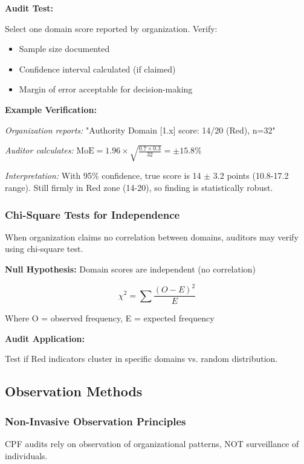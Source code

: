 \documentclass[11pt,a4paper]{article}
\begin{document}
\textbf{Audit Test:}

Select one domain score reported by organization. Verify:
\begin{itemize}
\item Sample size documented
\item Confidence interval calculated (if claimed)
\item Margin of error acceptable for decision-making
\end{itemize}

\textbf{Example Verification:}

\textit{Organization reports:} "Authority Domain [1.x] score: 14/20 (Red), n=32"

\textit{Auditor calculates:} $\text{MoE} = 1.96 \times \sqrt{\frac{0.7 \times 0.3}{32}} = \pm 15.8\%$

\textit{Interpretation:} With 95\% confidence, true score is 14 $\pm$ 3.2 points (10.8-17.2 range). Still firmly in Red zone (14-20), so finding is statistically robust.

\subsubsection{Chi-Square Tests for Independence}

When organization claims no correlation between domains, auditors may verify using chi-square test.

\textbf{Null Hypothesis:} Domain scores are independent (no correlation)

\begin{equation}
\chi^2 = \sum \frac{(O - E)^2}{E}
\end{equation}

Where O = observed frequency, E = expected frequency

\textbf{Audit Application:}

Test if Red indicators cluster in specific domains vs. random distribution.

\subsection{Observation Methods}

\subsubsection{Non-Invasive Observation Principles}

CPF audits rely on observation of organizational patterns, NOT surveillance of individuals.
\end{document}

